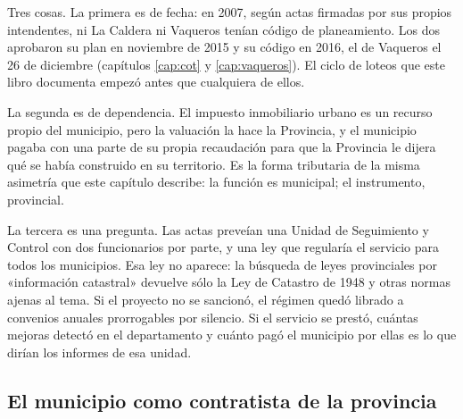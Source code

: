 \begin{cautela}
Tres cosas. La primera es de fecha: en 2007, según actas firmadas por sus propios intendentes, ni La Caldera ni Vaqueros tenían código de planeamiento. Los dos aprobaron su plan en noviembre de 2015 y su código en 2016, el de Vaqueros el 26 de diciembre (capítulos \ref{cap:cot} y \ref{cap:vaqueros}). El ciclo de loteos que este libro documenta empezó antes que cualquiera de ellos.

La segunda es de dependencia. El impuesto inmobiliario urbano es un recurso propio del municipio, pero la valuación la hace la Provincia, y el municipio pagaba con una parte de su propia recaudación para que la Provincia le dijera qué se había construido en su territorio. Es la forma tributaria de la misma asimetría que este capítulo describe: la función es municipal; el instrumento, provincial.

La tercera es una pregunta. Las actas preveían una Unidad de Seguimiento y Control con dos funcionarios por parte, y una ley que regularía el servicio para todos los municipios. Esa ley no aparece: la búsqueda de leyes provinciales por «información catastral» devuelve sólo la Ley de Catastro de 1948 y otras normas ajenas al tema. Si el proyecto no se sancionó, el régimen quedó librado a convenios anuales prorrogables por silencio. Si el servicio se prestó, cuántas mejoras detectó en el departamento y cuánto pagó el municipio por ellas es lo que dirían los informes de esa unidad. 
\end{cautela}


\subsection*{El municipio como contratista de la provincia}

